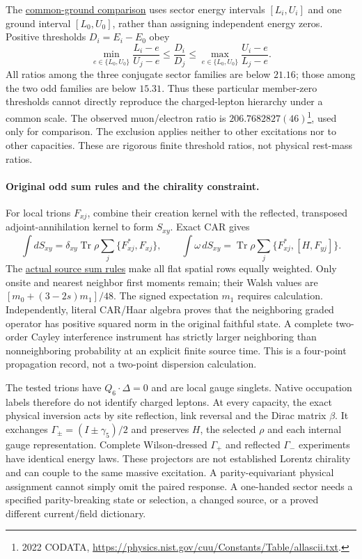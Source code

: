 The \href{https://github.com/FloatingPragma/observer-patch-holography/blob/main/model/standard_model_source_map/candidates/FINITE_SECTOR_RATIOS.md}{common-ground comparison}
uses sector energy intervals $[L_i,U_i]$ and one ground interval
$[L_0,U_0]$, rather than assigning independent energy zeros. Positive
thresholds $D_i=E_i-E_0$ obey
\[
 \min_{e\in\{L_0,U_0\}}\frac{L_i-e}{U_j-e}
 \le\frac{D_i}{D_j}\le
 \max_{e\in\{L_0,U_0\}}\frac{U_i-e}{L_j-e}.
\]
All ratios among the three conjugate sector families are below $21.16$;
those among the two odd families are below $15.31$. Thus these particular
member-zero thresholds cannot directly reproduce the charged-lepton
hierarchy under a common scale. The observed muon/electron ratio is
$206.7682827(46)$\footnote{2022 CODATA, \url{https://physics.nist.gov/cuu/Constants/Table/allascii.txt}.},
used only for comparison. The exclusion applies neither to other
excitations nor to other capacities. These are rigorous finite
threshold ratios, not physical rest-mass ratios.

\paragraph{Original odd sum rules and the chirality constraint.}
For local trions $F_{xj}$, combine their creation kernel with the reflected,
transposed adjoint-annihilation kernel to form $S_{xy}$. Exact CAR gives
\[
 \int dS_{xy}=\delta_{xy}\operatorname{Tr}\rho
     \sum_j\{F_{xj}^*,F_{xj}\},\qquad
 \int\omega\,dS_{xy}=\operatorname{Tr}\rho
     \sum_j\{F_{xj}^*,[H,F_{yj}]\}.
\]
The \href{https://github.com/FloatingPragma/observer-patch-holography/blob/main/model/particle_primary_odd_sum_rules/PROOF.md}{actual source sum rules}
make all flat spatial rows equally weighted. Only onsite and nearest
neighbor first moments remain; their Walsh values are
$[m_0+(3-2s)m_1]/48$. The signed expectation $m_1$ requires
calculation. Independently, literal CAR/Haar algebra proves that the
neighboring graded operator has positive squared norm in the original
faithful state. A complete two-order Cayley interference instrument
has strictly larger neighboring than nonneighboring probability at
an explicit finite source time. This is a four-point propagation
record, not a two-point dispersion calculation.

The tested trions have $Q_6\cdot\Delta=0$ and are local gauge singlets.
Native occupation labels therefore do not identify charged leptons.
At every capacity, the exact physical inversion acts by site reflection,
link reversal and the Dirac matrix $\beta$. It exchanges
$\Gamma_\pm=(I\pm\gamma_5)/2$ and preserves $H$, the selected $\rho$
and each internal gauge representation. Complete Wilson-dressed
$\Gamma_+$ and reflected $\Gamma_-$ experiments have identical energy
laws. These projectors are not established Lorentz chirality and can
couple to the same massive excitation. A parity-equivariant physical
assignment cannot simply omit the paired response. A one-handed sector
needs a specified parity-breaking state or selection, a changed source,
or a proved different current/field dictionary.

